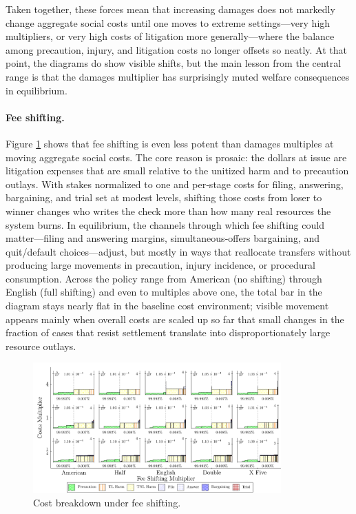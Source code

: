\documentclass{article}
\begin{document}
Taken together, these forces mean that increasing damages does not markedly change aggregate social costs until one moves to extreme settings—very high multipliers, or very high costs of litigation more generally—where the balance among precaution, injury, and litigation costs no longer offsets so neatly. At that point, the diagrams do show visible shifts, but the main lesson from the central range is that the damages multiplier has surprisingly muted welfare consequences in equilibrium.


\FloatBarrier
\paragraph{Fee shifting.}
Figure \ref{fig:fee_shifting} shows that fee shifting is even less potent than damages multiples at moving aggregate social costs. The core reason is prosaic: the dollars at issue are litigation expenses that are small relative to the unitized harm and to precaution outlays. With stakes normalized to one and per‑stage costs for filing, answering, bargaining, and trial set at modest levels, shifting those costs from loser to winner changes who writes the check more than how many real resources the system burns. In equilibrium, the channels through which fee shifting could matter—filing and answering margins, simultaneous‑offers bargaining, and quit/default choices—adjust, but mostly in ways that reallocate transfers without producing large movements in precaution, injury incidence, or procedural consumption. Across the policy range from American (no shifting) through English (full shifting) and even to multiples above one, the total bar in the diagram stays nearly flat in the baseline cost environment; visible movement appears mainly when overall costs are scaled up so far that small changes in the fraction of cases that resist settlement translate into disproportionately large resource outlays.

\begin{figure}[ht]
  \centering
  \includegraphics[width=0.85\textwidth]{../Figures/Cost Breakdown Fee Shifting Multiplier (All Rows).pdf}
  \caption{Cost breakdown under fee shifting.}
  \label{fig:fee_shifting}
\end{figure}
\end{document}
